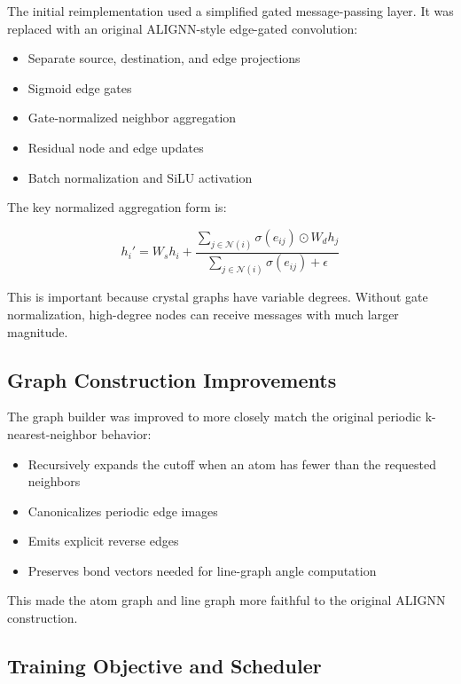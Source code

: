 \documentclass[11pt,a4paper]{article}
\begin{document}
The initial reimplementation used a simplified gated message-passing layer. It was replaced with an original ALIGNN-style edge-gated convolution:

\begin{itemize}
  \item Separate source, destination, and edge projections
  \item Sigmoid edge gates
  \item Gate-normalized neighbor aggregation
  \item Residual node and edge updates
  \item Batch normalization and SiLU activation
\end{itemize}

The key normalized aggregation form is:

\begin{equation}
h_i' = W_s h_i + \frac{\sum_{j \in \mathcal{N}(i)} \sigma(e_{ij}) \odot W_d h_j}{\sum_{j \in \mathcal{N}(i)} \sigma(e_{ij}) + \epsilon}
\end{equation}

This is important because crystal graphs have variable degrees. Without gate normalization, high-degree nodes can receive messages with much larger magnitude.

\subsection{Graph Construction Improvements}

The graph builder was improved to more closely match the original periodic k-nearest-neighbor behavior:

\begin{itemize}
  \item Recursively expands the cutoff when an atom has fewer than the requested neighbors
  \item Canonicalizes periodic edge images
  \item Emits explicit reverse edges
  \item Preserves bond vectors needed for line-graph angle computation
\end{itemize}

This made the atom graph and line graph more faithful to the original ALIGNN construction.

\subsection{Training Objective and Scheduler}
\end{document}
